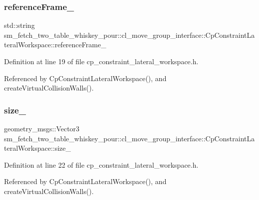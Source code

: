 \subsubsection{\texorpdfstring{reference\+Frame\+\_\+}{referenceFrame\_}}
{\footnotesize\ttfamily std\+::string sm\+\_\+fetch\+\_\+two\+\_\+table\+\_\+whiskey\+\_\+pour\+::cl\+\_\+move\+\_\+group\+\_\+interface\+::\+Cp\+Constraint\+Lateral\+Workspace\+::reference\+Frame\+\_\+\hspace{0.3cm}{\ttfamily [private]}}



Definition at line 19 of file cp\+\_\+constraint\+\_\+lateral\+\_\+workspace.\+h.



Referenced by Cp\+Constraint\+Lateral\+Workspace(), and create\+Virtual\+Collision\+Walls().

\mbox{\label{classsm__fetch__two__table__whiskey__pour_1_1cl__move__group__interface_1_1CpConstraintLateralWorkspace_a5d475923640591717dff98683928e89f}} 
\subsubsection{\texorpdfstring{size\+\_\+}{size\_}}
{\footnotesize\ttfamily geometry\+\_\+msgs\+::\+Vector3 sm\+\_\+fetch\+\_\+two\+\_\+table\+\_\+whiskey\+\_\+pour\+::cl\+\_\+move\+\_\+group\+\_\+interface\+::\+Cp\+Constraint\+Lateral\+Workspace\+::size\+\_\+\hspace{0.3cm}{\ttfamily [private]}}



Definition at line 22 of file cp\+\_\+constraint\+\_\+lateral\+\_\+workspace.\+h.



Referenced by Cp\+Constraint\+Lateral\+Workspace(), and create\+Virtual\+Collision\+Walls().



